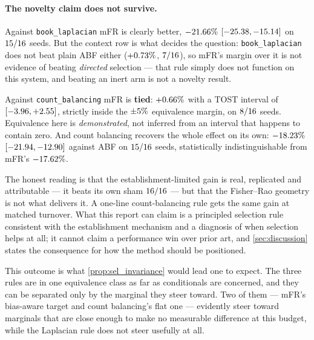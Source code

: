 \paragraph{The novelty claim does not survive.}

Against \texttt{book\_laplacian} mFR is clearly better, $-21.66\%$
$[-25.38, -15.14]$ on $15/16$ seeds. But the context row is what decides
the question: \texttt{book\_laplacian} does not beat plain ABF either
($+0.73\%$, $7/16$), so mFR's margin over it is not evidence of beating
\emph{directed} selection --- that rule simply does not function on this system, and beating an
inert arm is not a novelty result.

Against \texttt{count\_balancing} mFR is \textbf{tied}: $+0.66\%$ with a TOST interval
of $[-3.96, +2.55]$, strictly inside the $\pm5\%$
equivalence margin, on $8/16$ seeds. Equivalence here is \emph{demonstrated},
not inferred from an interval that happens to contain zero. And count balancing recovers the
whole effect on its own: $-18.23\%$
$[-21.94, -12.90]$ against ABF on $15/16$ seeds,
statistically indistinguishable from mFR's $-17.62\%$.

The honest reading is that the establishment-limited gain is real, replicated and attributable
--- it beats its own sham $16/16$ --- but that the Fisher--Rao geometry is not what
delivers it. A one-line count-balancing rule gets the same gain at matched turnover. What this
report can claim is a principled selection rule consistent with the establishment mechanism
and a diagnosis of when selection helps at all; it cannot claim a performance win over prior
art, and \cref{sec:discussion} states the consequence for how the method should be positioned.

This outcome is what \cref{prop:sel_invariance} would lead one to expect. The three rules are
in one equivalence class as far as conditionals are concerned, and they can be separated only
by the marginal they steer toward. Two of them --- mFR's bias-aware target and count
balancing's flat one --- evidently steer toward marginals that are close enough to make no
measurable difference at this budget, while the Laplacian rule does not steer usefully at all.


